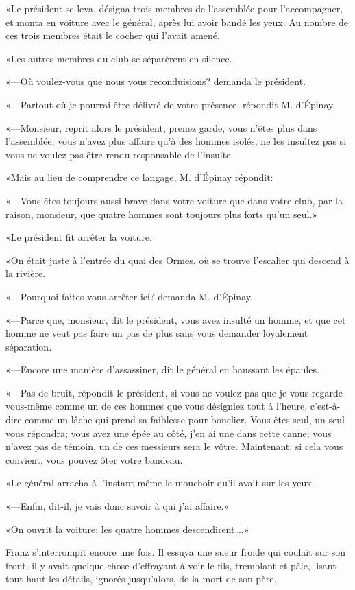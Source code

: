 «Le président se leva, désigna trois membres de l'assemblée pour l'accompagner, et monta en voiture avec le général, après lui avoir bandé les yeux. Au nombre de ces trois membres était le cocher qui l'avait amené. 

«Les autres membres du club se séparèrent en silence. 

«—Où voulez-vous que nous vous reconduisions? demanda le président. 

«—Partout où je pourrai être délivré de votre présence, répondit M. d'Épinay. 

«—Monsieur, reprit alors le président, prenez garde, vous n'êtes plus dans l'assemblée, vous n'avez plus affaire qu'à des hommes isolés; ne les insultez pas si vous ne voulez pas être rendu responsable de l'insulte. 

«Mais au lieu de comprendre ce langage, M. d'Épinay répondit: 

«—Vous êtes toujours aussi brave dans votre voiture que dans votre club, par la raison, monsieur, que quatre hommes sont toujours plus forts qu'un seul.» 

«Le président fit arrêter la voiture. 

«On était juste à l'entrée du quai des Ormes, où se trouve l'escalier qui descend à la rivière. 

«—Pourquoi faites-vous arrêter ici? demanda M. d'Épinay. 

«—Parce que, monsieur, dit le président, vous avez insulté un homme, et que cet homme ne veut pas faire un pas de plus sans vous demander loyalement séparation. 

«—Encore une manière d'assassiner, dit le général en haussant les épaules. 

«—Pas de bruit, répondit le président, si vous ne voulez pas que je vous regarde vous-même comme un de ces hommes que vous désigniez tout à l'heure, c'est-à-dire comme un lâche qui prend sa faiblesse pour bouclier. Vous êtes seul, un seul vous répondra; vous avez une épée au côté, j'en ai une dans cette canne; vous n'avez pas de témoin, un de ces messieurs sera le vôtre. Maintenant, si cela vous convient, vous pouvez ôter votre bandeau. 

«Le général arracha à l'instant même le mouchoir qu'il avait sur les yeux. 

«—Enfin, dit-il, je vais donc savoir à qui j'ai affaire.» 

«On ouvrit la voiture: les quatre hommes descendirent\dots.» 

Franz s'interrompit encore une fois. Il essuya une sueur froide qui coulait sur son front, il y avait quelque chose d'effrayant à voir le fils, tremblant et pâle, lisant tout haut les détails, ignorés jusqu'alors, de la mort de son père. 


